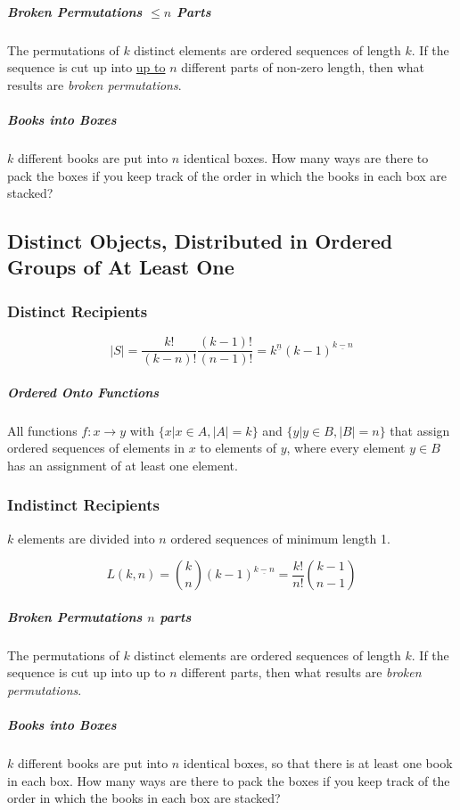 \subparagraph{Broken Permutations $\leq n$ Parts} The permutations of $k$ distinct elements are ordered sequences of length $k$. If the sequence is cut up into \underline{up to} $n$ different parts of non-zero length, then what results are \textit{broken permutations}.

\subparagraph{Books into Boxes} $k$ different books are put into $n$ identical boxes. How many ways are there to pack the boxes if you keep track of the order in which the books in each box are stacked? 


\subsection{Distinct Objects, Distributed in Ordered Groups of At Least One}

\subsubsection{Distinct Recipients}

\begin{equation}
|S| = \frac{k!}{(k-n)!}\frac{(k-1)!}{(n-1)!} = k^{\underline{n}} (k-1)^{\underline{k-n}}
\end{equation}

\subparagraph{Ordered Onto Functions} All functions $f: x \rightarrow y$ with $\{x | x\in A, |A| = k \}$ and $\{y | y\in B, |B| = n\}$ that assign ordered sequences of elements in $x$ to elements of $y$, where every element $y\in B$ has an assignment of at least one element.

\subsubsection{Indistinct Recipients}
$k$ elements are divided into $n$ ordered sequences of minimum length 1.

\begin{equation}
L(k,n)= {k \choose n} (k-1)^{\underline{k-n}} = \frac{k!}{n!}{ k-1 \choose n-1 }
\end{equation}
	
	
\subparagraph{Broken Permutations $n$ parts} The permutations of $k$ distinct elements are ordered sequences of length $k$. If the sequence is cut up into up to $n$ different parts, then what results are \textit{broken permutations}.

\subparagraph{Books into Boxes} $k$ different books are put into $n$ identical boxes, so that there is at least one book in each box. How many ways are there to pack the boxes if you keep track of the order in which the books in each box are stacked? 


